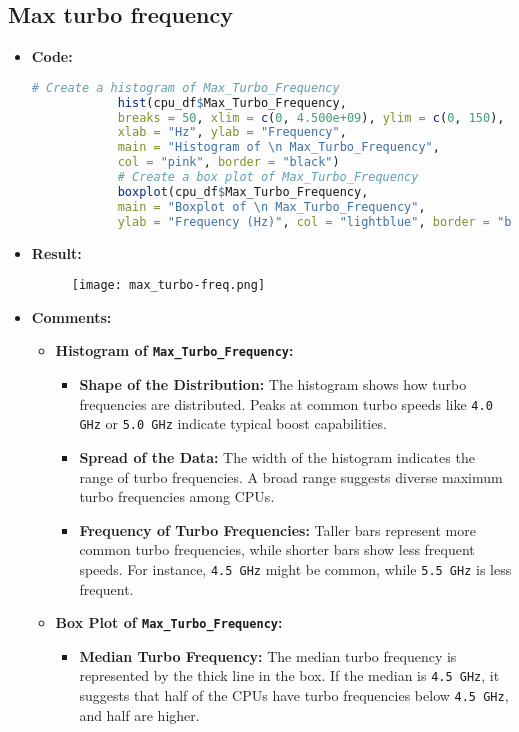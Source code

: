 \documentclass{article}
\begin{document}
	\subsection{Max turbo frequency}
	\begin{itemize}
		\item \textbf{Code:}
		\begin{lstlisting}[basicstyle=\ttfamily, frame=single,language=R]
			# Create a histogram of Max_Turbo_Frequency
			hist(cpu_df$Max_Turbo_Frequency, 
			breaks = 50, xlim = c(0, 4.500e+09), ylim = c(0, 150), 
			xlab = "Hz", ylab = "Frequency", 
			main = "Histogram of \n Max_Turbo_Frequency", 
			col = "pink", border = "black")
			# Create a box plot of Max_Turbo_Frequency
			boxplot(cpu_df$Max_Turbo_Frequency, 
			main = "Boxplot of \n Max_Turbo_Frequency", 
			ylab = "Frequency (Hz)", col = "lightblue", border = "black")
		\end{lstlisting}
		\item \textbf{Result:}
		\begin{figure}[h]
			\centering
			\texttt{[image: max\_turbo-freq.png]}    %
			\label{fig:enter-label}
		\end{figure}
		\item \textbf{Comments:}
		\begin{itemize}
			\item \textbf{Histogram of \texttt{Max\_Turbo\_Frequency}:}
			\begin{itemize}
				\item \textbf{Shape of the Distribution:} The histogram shows how turbo frequencies are distributed. Peaks at common turbo speeds like \texttt{4.0 GHz} or \texttt{5.0 GHz} indicate typical boost capabilities.
				\item \textbf{Spread of the Data:} The width of the histogram indicates the range of turbo frequencies. A broad range suggests diverse maximum turbo frequencies among CPUs.
				\item \textbf{Frequency of Turbo Frequencies:} Taller bars represent more common turbo frequencies, while shorter bars show less frequent speeds. For instance, \texttt{4.5 GHz} might be common, while \texttt{5.5 GHz} is less frequent.
			\end{itemize}
			\item \textbf{Box Plot of \texttt{Max\_Turbo\_Frequency}:}
			\begin{itemize}
				\item \textbf{Median Turbo Frequency:} The median turbo frequency is represented by the thick line in the box. If the median is \texttt{4.5 GHz}, it suggests that half of the CPUs have turbo frequencies below \texttt{4.5 GHz}, and half are higher.

\end{itemize}
\end{itemize}
\end{itemize}
\end{document}
